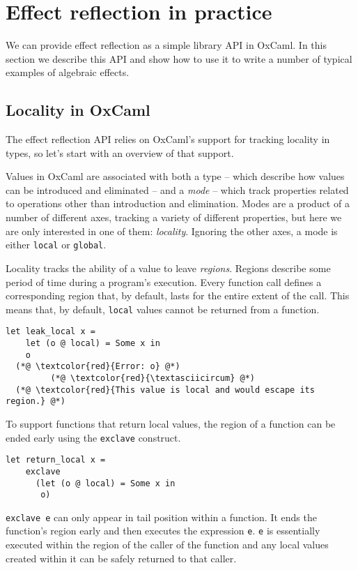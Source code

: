 \documentclass[acmsmall, screen, nonacm]{acmart}
\theoremstyle{definition}
\begin{document}
\section{Effect reflection in practice}
\label{sec:practice}

We can provide effect reflection as a simple library API in OxCaml. In
this section we describe this API and show how to use it to write a
number of typical examples of algebraic effects.

\subsection{Locality in OxCaml}

The effect reflection API relies on OxCaml's support for tracking
locality in types, so let's start with an overview of that support.

Values in OxCaml are associated with both a type -- which describe how
values can be introduced and eliminated -- and a \emph{mode} -- which
track properties related to operations other than introduction and
elimination. Modes are a product of a number of different axes, tracking
a variety of different properties, but here we are only interested in
one of them: \emph{locality}. Ignoring the other axes, a mode is either
\lstinline[style=oxcaml]{local} or \lstinline[style=oxcaml]{global}.

Locality tracks the ability of a value to leave \emph{regions}.  Regions
describe some period of time during a program's execution. Every
function call defines a corresponding region that, by default, lasts for
the entire extent of the call. This means that, by default,
\lstinline[style=oxcaml]{local} values cannot be returned from a
function.
\begin{lstlisting}[style=oxcaml]
  let leak_local x =
    let (o @ local) = Some x in
    o
  (*@ \textcolor{red}{Error: o} @*)
         (*@ \textcolor{red}{\textasciicircum} @*)
  (*@ \textcolor{red}{This value is local and would escape its region.} @*)
\end{lstlisting}

To support functions that return local values, the region of a function
can be ended early using the \lstinline[style=oxcaml]{exclave} construct.
\begin{lstlisting}[style=oxcaml]
  let return_local x =
    exclave
      (let (o @ local) = Some x in
       o)
\end{lstlisting}
\lstinline[style=oxcaml]{exclave e} can only appear in tail position
within a function.  It ends the function's region early and then
executes the expression
\lstinline[style=oxcaml]{e}. \lstinline[style=oxcaml]{e} is essentially
executed within the region of the caller of the function and any local
values created within it can be safely returned to that caller.
\end{document}
